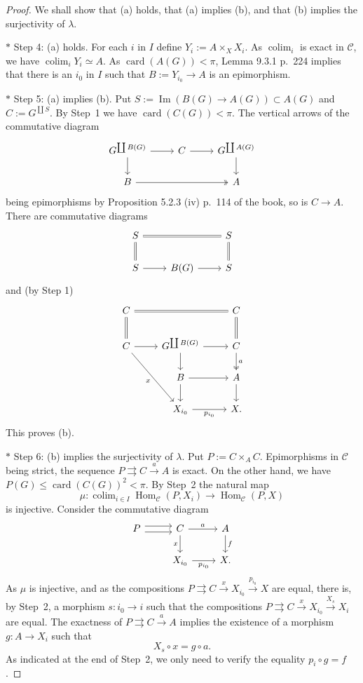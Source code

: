 \documentclass[12pt]{article}%
\theoremstyle{remark}
\theoremstyle{definition}
\newcommand{\nn}{\noindent}
\newcommand{\C}{\mathcal C}
\newcommand{\parar}{\rightrightarrows}
\newcommand{\xr}{\xrightarrow}
\DeclareMathOperator*{\colim}{colim}
\DeclareMathOperator{\card}{card}%
\DeclareMathOperator{\Ima}{Im}
\DeclareMathOperator{\Hom}{Hom}%
\begin{document}
\begin{proof}
We shall show that (a) holds, that (a) implies (b), and that (b) implies the surjectivity of $\lambda$.

\nn $*$ Step 4: (a) holds. For each $i$ in $I$ define $Y_i:=A\times_XX_i$. As $\colim_i$ is exact in $\C$, we have $\colim_iY_i\simeq A$. As $\card(A(G))<\pi$, Lemma 9.3.1 p.~224 implies that there is an $i_0$ in $I$ such that $B:=Y_{i_0}\to A$ is an epimorphism.

\nn $*$ Step 5: (a) implies (b). Put $S:=\Ima(B(G)\to A(G))\subset A(G)$ and $C:=G^{\coprod S}$. By Step~1 we have $\card(C(G))<\pi$. The vertical arrows of the commutative diagram 
$$
\begin{tikzcd}
G^{\coprod B(G)}\ar{r}\ar{d}&C\ar{r}&G^{\coprod A(G)}\ar{d}\\ 
B\ar[two heads]{rr}&&A
\end{tikzcd}
$$ 
being epimorphisms by Proposition 5.2.3 (iv) p.~114 of the book, so is $C\to A$. There are commutative diagrams 
$$
\begin{tikzcd}
S\ar[equal]{rr}\ar[equal]{d}&&S\ar[equal]{d}\\ 
S\ar{r}&B(G)\ar{r}&S
\end{tikzcd}
$$ 
and (by Step 1)
$$
\begin{tikzcd}
C\ar[equal]{rr}\ar[equal]{d}&&C\ar[equal]{d}\\ 
C\ar{r}\ar{rdd}[swap]{x}&G^{\coprod B(G)}\ar{r}\ar{d}&C\ar[two heads]{d}{a}\\ 
{}&B\ar{r}\ar{d}&A\ar{d}\\ 
{}&X_{i_0}\ar{r}[swap]{p_{i_0}}&X.
\end{tikzcd}
$$ 
This proves (b).

\nn $*$ Step 6: (b) implies the surjectivity of $\lambda$. Put $P:=C\times_AC$. Epimorphisms in $\C$ being strict, the sequence $P\parar C\xr aA$ is exact. On the other hand, we have $P(G)\le\card(C(G))^2<\pi$. By Step~2 the natural map 
$$
\mu:\colim_{i\in I}\Hom_\C(P,X_i)\to\Hom_\C(P,X)
$$ 
is injective. Consider the commutative diagram 
$$
\begin{tikzcd}
P\ar[yshift=0.7ex]{r}\ar[yshift=-0.7ex]{r}&C\ar{r}{a}\ar{d}[swap]{x}&A\ar{d}{f}\\ 
{}&X_{i_0}\ar{r}[swap]{p_{i_0}}&X.
\end{tikzcd}
$$ 
As $\mu$ is injective, and as the compositions $P\parar C\xr xX_{i_0}\xr{p_{i_0}}X$ are equal, there is, by Step~2, a morphism $s:i_0\to i$ such that the compositions $P\parar C\xr xX_{i_0}\xr{X_s} X_i$ are equal. The exactness of $P\parar C\xr aA$ implies the existence of a morphism $g:A\to X_i$ such that 
%
\begin{equation}\label{ga}
X_s\circ x=g\circ a.
\end{equation}
%
As indicated at the end of Step~2, we only need to verify the equality $p_i\circ g=f$.


\end{proof}
\end{document}
